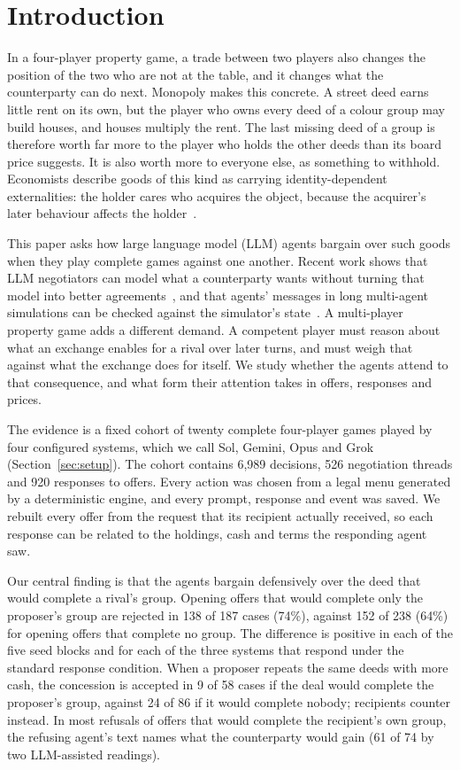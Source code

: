 \section{Introduction}
\label{sec:intro}

In a four-player property game, a trade between two players also changes the position of the two who are not at the table, and it changes what the counterparty can do next. Monopoly makes this concrete. A street deed earns little rent on its own, but the player who owns every deed of a colour group may build houses, and houses multiply the rent. The last missing deed of a group is therefore worth far more to the player who holds the other deeds than its board price suggests. It is also worth more to everyone else, as something to withhold. Economists describe goods of this kind as carrying identity-dependent externalities: the holder cares who acquires the object, because the acquirer's later behaviour affects the holder~\cite{jehiel1996nuclear}.

This paper asks how large language model (LLM) agents bargain over such goods when they play complete games against one another. Recent work shows that LLM negotiators can model what a counterparty wants without turning that model into better agreements~\cite{cosentino2026counterparty}, and that agents' messages in long multi-agent simulations can be checked against the simulator's state~\cite{li2026arena}. A multi-player property game adds a different demand. A competent player must reason about what an exchange enables for a rival over later turns, and must weigh that against what the exchange does for itself. We study whether the agents attend to that consequence, and what form their attention takes in offers, responses and prices.

The evidence is a fixed cohort of twenty complete four-player games played by four configured systems, which we call Sol, Gemini, Opus and Grok (Section~\ref{sec:setup}). The cohort contains 6,989 decisions, 526 negotiation threads and 920 responses to offers. Every action was chosen from a legal menu generated by a deterministic engine, and every prompt, response and event was saved. We rebuilt every offer from the request that its recipient actually received, so each response can be related to the holdings, cash and terms the responding agent saw.

Our central finding is that the agents bargain defensively over the deed that would complete a rival's group. Opening offers that would complete only the proposer's group are rejected in 138 of 187 cases (74\%), against 152 of 238 (64\%) for opening offers that complete no group. The difference is positive in each of the five seed blocks and for each of the three systems that respond under the standard response condition. When a proposer repeats the same deeds with more cash, the concession is accepted in 9 of 58 cases if the deal would complete the proposer's group, against 24 of 86 if it would complete nobody; recipients counter instead. In most refusals of offers that would complete the recipient's own group, the refusing agent's text names what the counterparty would gain (61 of 74 by two LLM-assisted readings).

